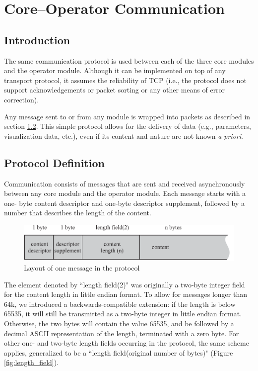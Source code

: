 \documentclass[letterpaper,oneside,12pt]{book}
\begin{document}


\section{Core--Operator Communication}

\subsection{Introduction}

The same communication protocol is used between each of the three core modules 
and the operator module. Although it can be implemented on top of any transport 
protocol, it assumes the reliability of TCP (i.e., the protocol does not support 
acknowledgements or packet sorting or any other means of error correction).

Any message sent to or from any module is wrapped into packets as described in 
section \ref{protocol_definition}. This simple protocol allows for the delivery 
of data (e.g., parameters, visualization data, etc.), even if its content and 
nature are not known \textit{a priori}.


\subsection{Protocol Definition}
\label{protocol_definition}

Communication consists of messages that are sent and received asynchronously 
between any core module and the operator module. Each message starts with a one-
byte content descriptor and one-byte descriptor supplement, followed by a number that describes the length of the content.

\begin{figure}[ht]
 \centerline{\includegraphics{figures/operator_prot}}
 \caption{Layout of one message in the protocol}
\end{figure}

The element denoted by ``length field(2)" was originally a two-byte integer 
field for the content length in little endian format. To allow for messages 
longer than 64k, we introduced a backwards-compatible extension: if the length 
is below 65535, it will still be transmitted as a two-byte integer in little 
endian format. Otherwise, the two bytes will contain the value 65535, and be 
followed by a decimal ASCII representation of the length, terminated with a zero 
byte. For other one- and two-byte length fields occurring in the protocol, the 
same scheme applies, generalized to be a ``length field(original number of 
bytes)" (Figure \ref{fig:length_field}).
\end{document}
